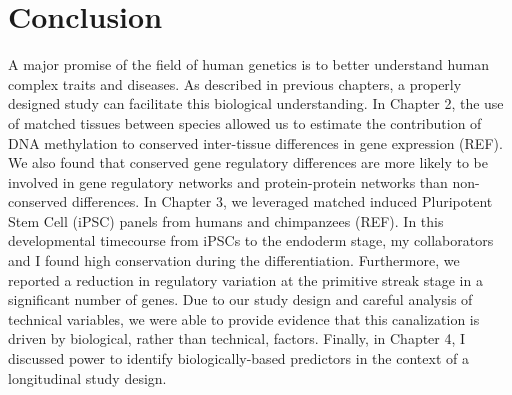 \chapter{Conclusion}\label{conclusion}

A major promise of the field of human genetics is to better understand human complex traits and diseases. As described in previous chapters, a properly designed study can facilitate this biological understanding. In Chapter 2, the use of matched tissues between species allowed us to estimate the contribution of DNA methylation to conserved inter-tissue differences in gene expression (REF).  We also found that conserved gene regulatory differences are more likely to be involved in gene regulatory networks and protein-protein networks than non-conserved differences. In Chapter 3, we leveraged matched induced Pluripotent Stem Cell (iPSC) panels from humans and chimpanzees (REF). In this developmental timecourse from iPSCs to the endoderm stage, my collaborators and I found high conservation during the differentiation. Furthermore, we reported a reduction in regulatory variation at the primitive streak stage in a significant number of genes. Due to our study design and careful analysis of technical variables, we were able to provide evidence that this canalization is driven by biological, rather than technical, factors. Finally, in Chapter 4, I discussed power to identify biologically-based predictors in the context of a longitudinal study design. 
